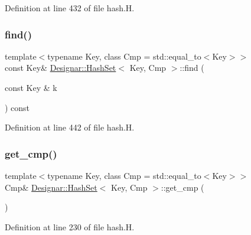 Definition at line 432 of file hash.\+H.

\mbox{\label{class_designar_1_1_hash_set_a10f079f500c953b61d77263f3b6c68ca}} 
\subsubsection{\texorpdfstring{find()}{find()}\hspace{0.1cm}{\footnotesize\ttfamily [2/2]}}
{\footnotesize\ttfamily template$<$typename Key, class Cmp = std\+::equal\+\_\+to$<$\+Key$>$$>$ \\
const Key\& \hyperlink{class_designar_1_1_hash_set}{Designar\+::\+Hash\+Set}$<$ Key, Cmp $>$\+::find (\begin{DoxyParamCaption}\item[{const Key \&}]{k }\end{DoxyParamCaption}) const\hspace{0.3cm}{\ttfamily [inline]}}



Definition at line 442 of file hash.\+H.

\mbox{\label{class_designar_1_1_hash_set_ad799ffaf641176e823513b63be44cfe2}} 
\subsubsection{\texorpdfstring{get\+\_\+cmp()}{get\_cmp()}\hspace{0.1cm}{\footnotesize\ttfamily [1/2]}}
{\footnotesize\ttfamily template$<$typename Key, class Cmp = std\+::equal\+\_\+to$<$\+Key$>$$>$ \\
Cmp\& \hyperlink{class_designar_1_1_hash_set}{Designar\+::\+Hash\+Set}$<$ Key, Cmp $>$\+::get\+\_\+cmp (\begin{DoxyParamCaption}{ }\end{DoxyParamCaption})\hspace{0.3cm}{\ttfamily [inline]}}



Definition at line 230 of file hash.\+H.

\mbox{\label{class_designar_1_1_hash_set_a7be703ea6ba171fc58ea5b5ffd8ffa6d}} 
